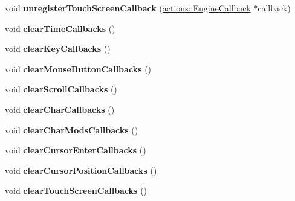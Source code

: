 \begin{DoxyCompactItemize}
\item 
\hypertarget{classfillwave_1_1Engine_a70b75b1b731c9a4985f346da4f8f490d}{}void {\bfseries unregister\+Touch\+Screen\+Callback} (\hyperlink{classfillwave_1_1actions_1_1EngineCallback}{actions\+::\+Engine\+Callback} $\ast$callback)\label{classfillwave_1_1Engine_a70b75b1b731c9a4985f346da4f8f490d}

\item 
\hypertarget{classfillwave_1_1Engine_ae8e2afbd8982598754e162024babb9c9}{}void {\bfseries clear\+Time\+Callbacks} ()\label{classfillwave_1_1Engine_ae8e2afbd8982598754e162024babb9c9}

\item 
\hypertarget{classfillwave_1_1Engine_a9f90630c4f013812480e2ab6b4c02349}{}void {\bfseries clear\+Key\+Callbacks} ()\label{classfillwave_1_1Engine_a9f90630c4f013812480e2ab6b4c02349}

\item 
\hypertarget{classfillwave_1_1Engine_a4f8c930d4f6f480d06cdf7b51c832c6c}{}void {\bfseries clear\+Mouse\+Button\+Callbacks} ()\label{classfillwave_1_1Engine_a4f8c930d4f6f480d06cdf7b51c832c6c}

\item 
\hypertarget{classfillwave_1_1Engine_a045648d991fcef2ed6f7fec829c37ec0}{}void {\bfseries clear\+Scroll\+Callbacks} ()\label{classfillwave_1_1Engine_a045648d991fcef2ed6f7fec829c37ec0}

\item 
\hypertarget{classfillwave_1_1Engine_a88dbcafd5555481da6267e05b1eb5e6b}{}void {\bfseries clear\+Char\+Callbacks} ()\label{classfillwave_1_1Engine_a88dbcafd5555481da6267e05b1eb5e6b}

\item 
\hypertarget{classfillwave_1_1Engine_a82fd5a72f17e81288f846e1af52294ed}{}void {\bfseries clear\+Char\+Mods\+Callbacks} ()\label{classfillwave_1_1Engine_a82fd5a72f17e81288f846e1af52294ed}

\item 
\hypertarget{classfillwave_1_1Engine_a29648a4414f7a025ebc4f01d37e029f2}{}void {\bfseries clear\+Cursor\+Enter\+Callbacks} ()\label{classfillwave_1_1Engine_a29648a4414f7a025ebc4f01d37e029f2}

\item 
\hypertarget{classfillwave_1_1Engine_add15877452d0e34f846aeca2ed512e34}{}void {\bfseries clear\+Cursor\+Position\+Callbacks} ()\label{classfillwave_1_1Engine_add15877452d0e34f846aeca2ed512e34}

\item 
\hypertarget{classfillwave_1_1Engine_ad353015eea27d0ec2ed9a16bff58f305}{}void {\bfseries clear\+Touch\+Screen\+Callbacks} ()\label{classfillwave_1_1Engine_ad353015eea27d0ec2ed9a16bff58f305}


\end{DoxyCompactItemize}

